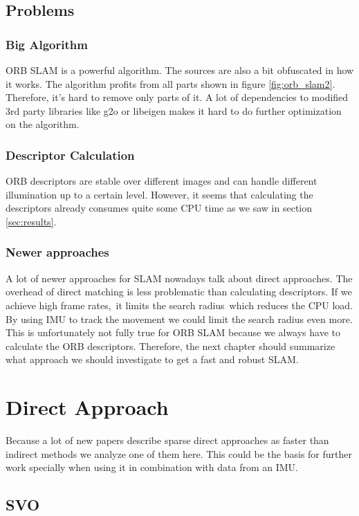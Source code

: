\documentclass[11pt,a4paper,titlepage,oneside]{report}
\begin{document}
\section{Problems}

\subsection{Big Algorithm}
ORB SLAM is a powerful algorithm. The sources are also a bit obfuscated in how it works. The algorithm profits from all parts shown in figure \ref{fig:orb_slam2}. Therefore, it's hard to remove only parts of it. A lot of dependencies to modified 3rd party libraries like g2o or libeigen makes it hard to do further optimization on the algorithm.

\subsection{Descriptor Calculation}
ORB descriptors are stable over different images and can handle different illumination up to a certain level. However, it seems that calculating the descriptors already consumes quite some CPU time as we saw in section \ref{sec:results}.

\subsection{Newer approaches}
A lot of newer approaches for SLAM nowadays talk about direct approaches. The overhead of direct matching is less problematic than calculating descriptors. If we achieve high frame rates, it limits the search radius which reduces the CPU load. By using IMU to track the movement we could limit the search radius even more. This is unfortunately not fully true for ORB SLAM because we always have to calculate the ORB descriptors. Therefore, the next chapter should summarize what approach we should investigate to get a fast and robust SLAM.

\chapter{Direct Approach}
Because a lot of new papers describe sparse direct approaches as faster than indirect methods we analyze one of them here. This could be the basis for further work specially when using it in combination with data from an IMU.

\section{SVO}
\end{document}

